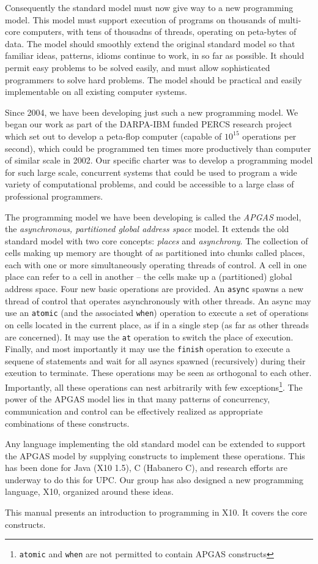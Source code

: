 Consequently the standard model must now give way to a new programming model. This model must support execution of programs on thousands of multi-core computers, with tens of thousadns of threads, operating on peta-bytes of data. The model should smoothly extend the original standard model so that familiar ideas, patterns, idioms continue to work, in so far as possible. It should permit easy problems to be solved easily, and must allow sophisticated programmers to solve hard problems.  The model should be practical and easily implementable on all existing computer systems.

Since 2004, we have been developing just such a new programming model. We began our work as part of the DARPA-IBM funded PERCS research project which set out to develop a peta-flop computer (capable of $10^15$ operations per second), which could be programmed ten times more productively than computer of similar scale in 2002.
Our specific charter was to develop a programming model for such large scale, concurrent systems that could be used to program a wide variety of computational problems, and could be accessible to a large class of professional programmers. 

The programming model we have been developing is called the {\em APGAS} model, the {\em asynchronous, partitioned global address space} model. It extends the old standard model with two core concepts: {\em places} and {\em asynchrony}. The collection of cells making up memory are thought of as partitioned into chunks called places, each with one or more simultaneously operating threads of control. A cell in one place can refer to a cell in another -- the cells make up a (partitioned) global address space. Four new basic operations are provided.  An {\tt async} spawns a new thread of control that operates asynchronously with other threads.  An async may use an {\tt atomic} (and the associated {\tt when}) operation to execute a set of operations on cells located in the current place, as if in a single step (as far as other threads are concerned). It may use the {\tt at} operation to switch the place of execution. Finally, and most importantly it may use the {\tt finish} operation to execute a sequene of statements and wait for all asyncs spawned (recursively) during their exeution to terminate.  These operations may be seen as orthogonal to each other. Importantly, all these operations can nest arbitrarily with few exceptions\footnote{{\tt atomic} and {\tt when} are not permitted to contain APGAS constructs}.  The power of the APGAS model lies in that many patterns of concurrency, communication and control can be effectively realized as appropriate combinations of these constructs.

Any language implementing the old standard model can be extended to support the APGAS model by supplying constructs to implement these operations. This has been done for Java (X10 1.5), C (Habanero C), and research efforts are underway to do this for UPC. Our group has also designed a new programming language, X10, organized around these ideas.

This manual presents an introduction to programming in X10.  It covers the core constructs.

